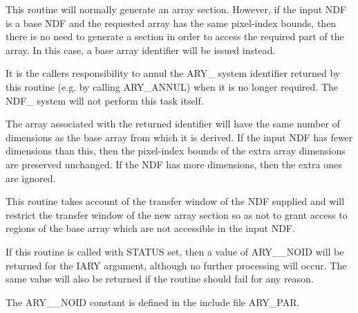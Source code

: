 {{{         \sstitem
         This routine will normally generate an array section. However,
         if the input NDF is a base NDF and the requested array has the
         same pixel-index bounds, then there is no need to generate a
         section in order to access the required part of the array. In
         this case, a base array identifier will be issued instead.

         \sstitem
         It is the callers responsibility to annul the ARY\_ system
         identifier returned by this routine (e.g. by calling ARY\_ANNUL)
         when it is no longer required. The NDF\_ system will not perform
         this task itself.

         \sstitem
         The array associated with the returned identifier will have
         the same number of dimensions as the base array from which it is
         derived. If the input NDF has fewer dimensions than this, then
         the pixel-index bounds of the extra array dimensions are
         preserved unchanged. If the NDF has more dimensions, then the
         extra ones are ignored.

         \sstitem
         This routine takes account of the transfer window of the NDF
         supplied and will restrict the transfer window of the new array
         section so as not to grant access to regions of the base array
         which are not accessible in the input NDF.

         \sstitem
         If this routine is called with STATUS set, then a value of
         ARY\_\_NOID will be returned for the IARY argument, although no
         further processing will occur. The same value will also be
         returned if the routine should fail for any reason.

         \sstitem
         The ARY\_\_NOID constant is defined in the include file ARY\_PAR.
      }
   }
}
